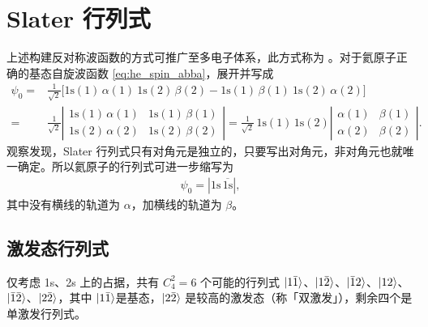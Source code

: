 \section{Slater 行列式}
上述构建反对称波函数的方式可推广至多电子体系，此方式称为 。对于氦原子正确的基态自旋波函数 \eqref{eq:he_spin_abba}，展开并写成
\begin{align}
    \psi_0=&\frac1{\sqrt2} \bigl[
        \mathrm{1s}(1)\,\alpha(1) \ \mathrm{1s}(2)\, \beta(2) - \mathrm{1s}(1)\,\beta(1)\ \mathrm{1s}(2)\,\alpha(2)
    \bigr] \\
    =& \frac1{\sqrt2} \left|\begin{matrix}
        \mathrm{1s}(1)\,\alpha(1) & \mathrm{1s}(1)\,\beta(1)\\
        \mathrm{1s}(2)\,\alpha(2) & \mathrm{1s}(2)\, \beta(2)
    \end{matrix}\right|
    = \frac1{\sqrt2} \, \mathrm{1s(1)\,1s(2)} 
    \left|
        \begin{matrix}
            \alpha(1) & \beta(1) \\ \alpha(2) & \beta(2)
        \end{matrix}
    \right|.
\end{align}
观察发现，Slater 行列式只有对角元是独立的，只要写出对角元，非对角元也就唯一确定。所以氦原子的行列式可进一步缩写为
\begin{align}
    \psi_0 = |\mathrm{1s}\,\overline{\mathrm{1s}}|,
\end{align}
其中没有横线的轨道为 $\alpha$，加横线的轨道为 $\beta$。
\subsection{激发态行列式}

仅考虑 1s、2s 上的占据，共有 $C_4^2 = 6$ 个可能的行列式 $\ket{1\bar{1}}$、$\ket{1\bar{2}}$、$\ket{\bar{1}2}$、$\ket{12}$、$\ket{\bar{1}\bar{2}}$、$\ket{2\bar{2}}$，其中 $\ket{1\bar{1}}$是基态，$\ket{2\bar{2}}$ 是较高的激发态（称「双激发」），剩余四个是单激发行列式。

